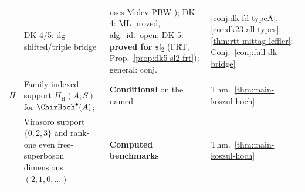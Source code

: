 \begin{center}
\begin{tabular}{@{}cp{4.4cm}p{3.8cm}p{4.6cm}@{}}
 & DK-4/5: dg-shifted/triple bridge & uses Molev PBW \cite{molev-yangians}); DK-4: ML proved, alg.\ id.\ open; DK-5: \textbf{proved for $\mathfrak{sl}_2$} (FRT, Prop.~\ref{prop:dk5-sl2-frt}); general: conj. & \ref{conj:dk-fd-typeA}, \ref{cor:dk23-all-types}, \ref{thm:rtt-mittag-leffler}; Conj.~\ref{conj:full-dk-bridge} \\[2pt]
$H$ & Family-indexed support
$H_{\mathrm H}(A;S)$ for $\ChirHoch^\bullet(A)$; &
\textbf{Conditional} on the named & Thm.~\ref{thm:main-koszul-hoch} \\
 & Virasoro support $\{0,2,3\}$ and rank-one even free-superboson
dimensions $(2,1,0,\ldots)$ & \textbf{Computed benchmarks} &
Thm.~\ref{thm:main-koszul-hoch} \\
\bottomrule
\end{tabular}
\end{center}

